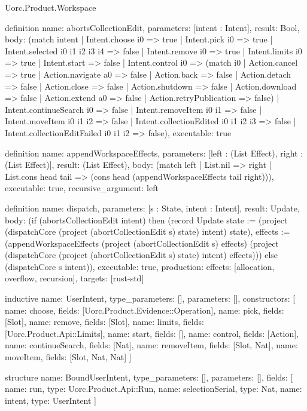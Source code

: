 \begin{lexlean}{Uorc.Product.Workspace}
\begin{semanticmodule}
definition{
  name: abortsCollectionEdit,
  parameters: [intent : Intent],
  result: Bool,
  body: (match intent
    | Intent.choose i0 => true
    | Intent.pick i0 => true
    | Intent.selected i0 i1 i2 i3 i4 => false
    | Intent.remove i0 => true
    | Intent.limits i0 => true
    | Intent.start => false
    | Intent.control i0 => (match i0
      | Action.cancel => true
      | Action.navigate a0 => false
      | Action.back => false
      | Action.detach => false
      | Action.close => false
      | Action.shutdown => false
      | Action.download => false
      | Action.extend a0 => false
      | Action.retryPublication => false)
    | Intent.continueSearch i0 => false
    | Intent.removeItem i0 i1 => false
    | Intent.moveItem i0 i1 i2 => false
    | Intent.collectionEdited i0 i1 i2 i3 => false
    | Intent.collectionEditFailed i0 i1 i2 => false),
  executable: true
}

definition{
  name: appendWorkspaceEffects,
  parameters: [left : (List Effect), right : (List Effect)],
  result: (List Effect),
  body: (match left
    | List.nil => right
    | List.cons head tail => (cons head (appendWorkspaceEffects tail right))),
  executable: true,
  recursive_argument: left
}

definition{
  name: dispatch,
  parameters: [s : State, intent : Intent],
  result: Update,
  body: (if (abortsCollectionEdit intent) then (record Update {state := (project (dispatchCore (project (abortCollectionEdit s) state) intent) state), effects := (appendWorkspaceEffects (project (abortCollectionEdit s) effects) (project (dispatchCore (project (abortCollectionEdit s) state) intent) effects))}) else (dispatchCore s intent)),
  executable: true,
  production: {effects: [allocation, overflow, recursion], targets: [rust-std]}
}

inductive{
  name: UserIntent,
  type_parameters: [],
  parameters: [],
  constructors: [
    {name: choose, fields: [Uorc.Product.Evidence::Operation]},
    {name: pick, fields: [Slot]},
    {name: remove, fields: [Slot]},
    {name: limits, fields: [Uorc.Product.Api::Limits]},
    {name: start, fields: []},
    {name: control, fields: [Action]},
    {name: continueSearch, fields: [Nat]},
    {name: removeItem, fields: [Slot, Nat]},
    {name: moveItem, fields: [Slot, Nat, Nat]}
  ]
}

structure{
  name: BoundUserIntent,
  type_parameters: [],
  parameters: [],
  fields: [
    {name: run, type: Uorc.Product.Api::Run},
    {name: selectionSerial, type: Nat},
    {name: intent, type: UserIntent}
  ]
}


\end{semanticmodule}
\end{lexlean}
